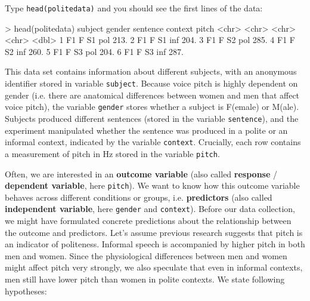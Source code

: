 \documentclass[nobib]{tufte-handout}
\newcommand{\ri}[1]{\lstinline{#1}}  %
\begin{document}
\vspace*{-0.5cm}

\noindent Type \ri{head(politedata)} and you should see the first lines of the
data:

\bigskip

\begin{minipage}[]{\textwidth}
\begin{rc}
> head(politedata)
   subject gender sentence context pitch
   <chr>   <chr>  <chr>    <chr>   <dbl>
 1 F1      F      S1       pol      213.
 2 F1      F      S1       inf      204.
 3 F1      F      S2       pol      285.
 4 F1      F      S2       inf      260.
 5 F1      F      S3       pol      204.
 6 F1      F      S3       inf      287.
\end{rc}
\end{minipage}

\vspace*{-0.5cm}

\noindent This data set contains information about different subjects, with an anonymous identifier stored in variable \texttt{subject}.
Because voice pitch is highly dependent on gender (i.e. there are anatomical differences between women and men that affect voice pitch), the variable \texttt{gender} stores whether a subject is F(emale) or M(ale).
Subjects produced different sentences (stored in the variable \texttt{sentence}), and the experiment manipulated whether the sentence was produced in a polite or an informal context, indicated by the variable \texttt{context}. Crucially, each row contains a measurement of pitch in Hz stored in the variable \texttt{pitch}.

Often, we are interested in an \textbf{outcome variable} (also called \textbf{response} / \textbf{dependent variable}, here \texttt{pitch}). We want to know how this outcome variable behaves
across different conditions or groups, i.e. \textbf{predictors} (also called \textbf{independent variable}, here \texttt{gender} and \texttt{context}). Before our data collection,
we might have formulated concrete predictions about the relationship between the outcome and predictors. Let's assume previous research suggests that pitch is an indicator of politeness. Informal speech is accompanied by higher pitch in both men and women. Since the physiological differences between men and women might affect pitch very strongly, we also speculate that even in informal contexts, men still have lower pitch than women in polite contexts. We state following hypotheses:
\end{document}
